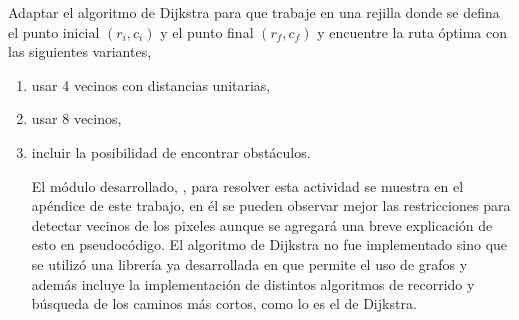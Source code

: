 Adaptar el algoritmo de Dijkstra para que trabaje en una rejilla donde se defina el punto inicial $(r_i, c_i)$ y el punto final $(r_f, c_f)$ y encuentre la ruta óptima con las siguientes variantes,
\begin{enumerate}
    \item usar 4 vecinos con distancias unitarias,
    \item usar 8 vecinos,
    \item incluir la posibilidad de encontrar obstáculos.
    \begin{solution}
        El módulo desarrollado, , para resolver esta actividad se muestra en el apéndice de este trabajo, en él se pueden observar mejor las restricciones para detectar vecinos de los pixeles aunque se agregará una breve explicación de esto en pseudocódigo. El algoritmo de Dijkstra no fue implementado sino que se utilizó una librería \cite{Graphs2021} ya desarrollada en  que permite el uso de grafos y además incluye la implementación de distintos algoritmos de recorrido y búsqueda de los caminos más cortos, como lo es el de Dijkstra.


\end{solution}
\end{enumerate}
